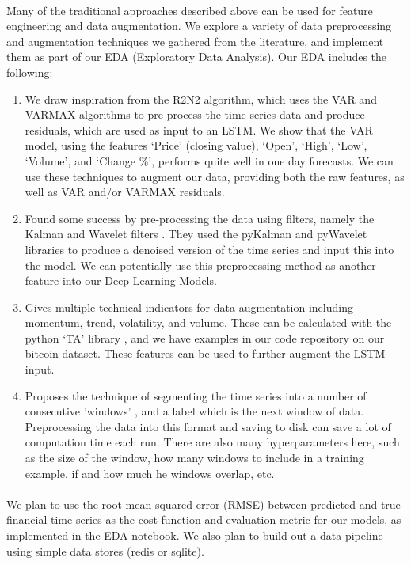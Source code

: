 \documentclass{article}
\begin{document}
\paragraph{}
Many of the traditional approaches described above can be used for feature engineering and data augmentation. We explore a variety of data preprocessing and augmentation techniques we gathered from the literature, and implement them as part of our EDA (Exploratory Data Analysis). Our EDA includes the following:

\begin{enumerate}
\item  We draw inspiration from the R2N2 \cite{1_website} algorithm, which uses the VAR and VARMAX algorithms to pre-process the time series data and produce residuals, which are used as input to an LSTM. We show that the VAR model, using the features ‘Price’ (closing value), ‘Open’, ‘High’, ‘Low’, ‘Volume’, and ‘Change \%’, performs quite well in one day forecasts. We can use these techniques to augment our data, providing both the raw features, as well as VAR and/or VARMAX residuals.

\item Found some success by pre-processing the data using filters, namely the Kalman and Wavelet filters \cite{2_website}. They used the pyKalman and pyWavelet libraries to produce a denoised version of the time series and input this into the model. We can potentially use this preprocessing method as another feature into our Deep Learning Models.

\item Gives multiple technical indicators for data augmentation including momentum, trend, volatility, and volume. These can be calculated with the python ‘TA’ library \cite{3_website}, and we have examples in our code repository on our bitcoin dataset. These features can be used to further augment the LSTM input.

\item Proposes the technique of segmenting the time series into a number of consecutive 'windows'  \cite{4_website}, and a label which is the next window of data. Preprocessing the data into this format and saving to disk can save a lot of computation time each run. There are also many hyperparameters here, such as the size of the window, how many windows to include in a training example, if and how much he windows overlap, etc.
\end{enumerate}

\paragraph{}
We plan to use the root mean squared error (RMSE) between predicted and true financial time series as the cost function and evaluation metric for our models, as implemented in the EDA notebook. We also plan to build out a data pipeline using simple data stores (redis or sqlite).
\end{document}
